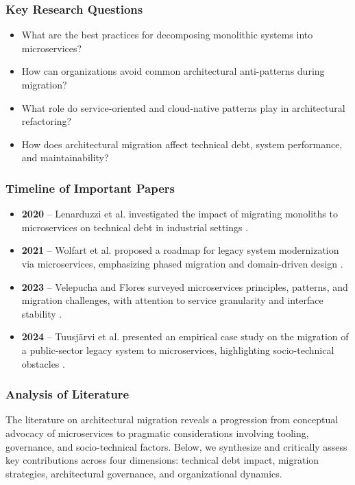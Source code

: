 \documentclass[12pt]{article}
\begin{document}
\subsubsection{Key Research Questions}

\begin{itemize}
    \item What are the best practices for decomposing monolithic systems into microservices?
    \item How can organizations avoid common architectural anti-patterns during migration?
    \item What role do service-oriented and cloud-native patterns play in architectural refactoring?
    \item How does architectural migration affect technical debt, system performance, and maintainability?
\end{itemize}

\subsubsection{Timeline of Important Papers}

\begin{itemize}
    \item \textbf{2020} – Lenarduzzi et al. investigated the impact of migrating monoliths to microservices on technical debt in industrial settings \cite{lenarduzzi2020}.
    \item \textbf{2021} – Wolfart et al. proposed a roadmap for legacy system modernization via microservices, emphasizing phased migration and domain-driven design \cite{wolfart2021}.
    \item \textbf{2023} – Velepucha and Flores surveyed microservices principles, patterns, and migration challenges, with attention to service granularity and interface stability \cite{velepucha2023}.
    \item \textbf{2024} – Tuusjärvi et al. presented an empirical case study on the migration of a public-sector legacy system to microservices, highlighting socio-technical obstacles \cite{tuusjarvi2024}.
\end{itemize}
\subsubsection{Analysis of Literature}

The literature on architectural migration reveals a progression from conceptual advocacy of microservices to pragmatic considerations involving tooling, governance, and socio-technical factors. Below, we synthesize and critically assess key contributions across four dimensions: technical debt impact, migration strategies, architectural governance, and organizational dynamics.
\end{document}
